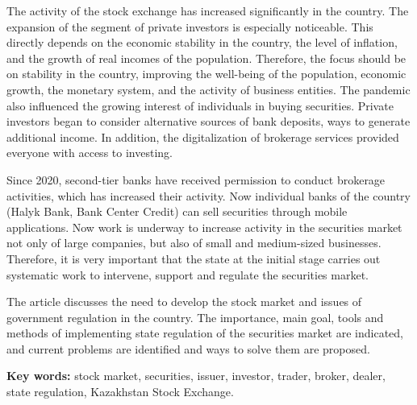 The activity of the stock exchange has increased significantly in the
country. The expansion of the segment of private investors is especially
noticeable. This directly depends on the economic stability in the
country, the level of inflation, and the growth of real incomes of the
population. Therefore, the focus should be on stability in the country,
improving the well-being of the population, economic growth, the
monetary system, and the activity of business entities. The pandemic
also influenced the growing interest of individuals in buying
securities. Private investors began to consider alternative sources of
bank deposits, ways to generate additional income. In addition, the
digitalization of brokerage services provided everyone with access to
investing.

Since 2020, second-tier banks have received permission to conduct
brokerage activities, which has increased their activity. Now individual
banks of the country (Halyk Bank, Bank Center Credit) can sell
securities through mobile applications. Now work is underway to increase
activity in the securities market not only of large companies, but also
of small and medium-sized businesses. Therefore, it is very important
that the state at the initial stage carries out systematic work to
intervene, support and regulate the securities market.

The article discusses the need to develop the stock market and issues of
government regulation in the country. The importance, main goal, tools
and methods of implementing state regulation of the securities market
are indicated, and current problems are identified and ways to solve
them are proposed.

{\bfseries Key words:} stock market, securities, issuer, investor, trader,
broker, dealer, state regulation, Kazakhstan Stock Exchange.

